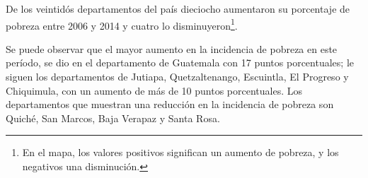  De los veintidós departamentos del país dieciocho aumentaron su porcentaje de pobreza entre 2006 y 2014 y cuatro lo disminuyeron\footnote{En el mapa, los valores positivos significan un aumento de pobreza, y los negativos una disminución. }. 

Se puede observar que el mayor aumento en la incidencia de pobreza  en este período, se dio en el departamento de Guatemala con 17 puntos porcentuales; le siguen los departamentos de Jutiapa, Quetzaltenango, Escuintla, El Progreso y Chiquimula, con un aumento de más de 10 puntos porcentuales. Los departamentos que muestran una reducción en la incidencia de  pobreza son Quiché, San Marcos, Baja Verapaz y Santa Rosa. 